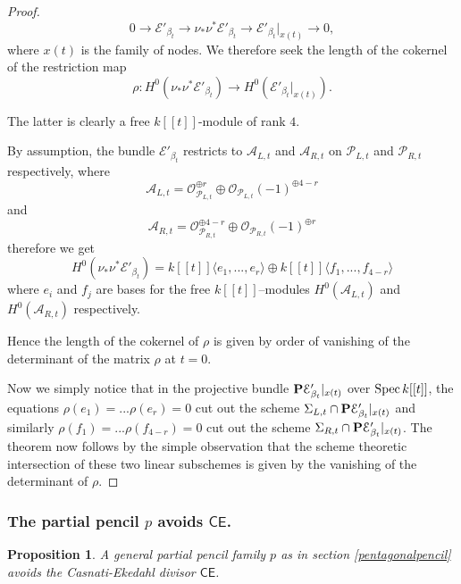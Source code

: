 \documentclass[reqno, 10 pt]{article}
\newtheorem{prop}[thm]{Proposition}
\theoremstyle{definition}
\theoremstyle{remark}
\numberwithin{equation}{section}
\numberwithin{thm}{section}
\numberwithin{prop}{section}
\numberwithin{lem}{section}
\numberwithin{cor}{section}
\numberwithin{conj}{section}
\numberwithin{defn}{section}
\renewcommand{\to}{\longrightarrow}
\newcommand{\sfCE}{{\mathsf {CE}}}
\newcommand{\cA}{{\mathcal A}}
\newcommand{\cE}{{\mathcal E}}
\newcommand{\cO}{{\mathcal O}}
\newcommand{\cP}{{\mathcal P}}
\renewcommand{\P}{{\bf P}}
\newcommand {\from}{{\colon}}
\newcommand{\Spec}{{\text{\rm Spec}\,}}
\begin{document}
\begin{proof}
\begin{equation}\label{exactseq2component}
0 \to \cE'_{\beta_{t}} \to \nu_{*}\nu^{*}\cE'_{\beta_{t}} \to \cE'_{\beta_{t}}|_{x(t)} \to 0,
\end{equation} 
where $x(t)$ is the family of nodes. We therefore seek the length of the cokernel of the restriction map $$\rho \from H^{0}(\nu_{*}\nu^{*}\cE'_{\beta_{t}}) \to H^{0}(\cE'_{\beta_{t}}|_{x(t)}).$$

The latter is clearly a free $k[[t]]$-module of rank $4$.



 By assumption, the bundle $\cE'_{\beta_{t}}$ restricts to $\cA_{L,t}$ and $\cA_{R,t}$ on $\cP_{L,t}$ and $\cP_{R,t}$ respectively, where $$\cA_{L,t} = \cO_{\cP_{L,t}}^{\oplus r} \oplus \cO_{\cP_{L,t}}(-1)^{\oplus 4-r}$$ and $$\cA_{R,t} = \cO_{\cP_{R,t}}^{\oplus 4-r} \oplus \cO_{\cP_{R,t}}(-1)^{\oplus r}$$ therefore we get \[H^{0}(\nu_{*}\nu^{*}\cE'_{\beta_{t}}) = k[[t]]\langle e_{1}, ... , e_{r} \rangle \oplus k[[t]]\langle f_{1}, ... , f_{4-r} \rangle \] where $e_{i}$ and $f_{j}$ are bases for the free $k[[t]]$--modules $H^{0}(\cA_{L,t})$ and $H^{0}(\cA_{R,t})$ respectively. 

Hence the length of the cokernel of $\rho$ is given by order of vanishing of the determinant of the matrix $\rho$ at $t=0$. 

Now we simply notice that in the projective bundle $\P \cE'_{\beta_{t}}|_{x(t)}$ over $\Spec k[[t]]$, the equations $\rho(e_{1}) = ... \rho(e_{r}) = 0$ cut out the scheme $\Sigma_{L,t} \cap \P \cE'_{\beta_{t}}|_{x(t)}$ and similarly $\rho(f_{1}) = ... \rho(f_{4-r}) = 0$ cut out the scheme $\Sigma_{R,t} \cap \P \cE'_{\beta_{t}}|_{x(t)}$.  The theorem now follows by the simple observation that the scheme theoretic intersection of these two linear subschemes is given by the vanishing of the determinant of $\rho$. 

\end{proof}

\subsubsection{The partial pencil $p$ avoids $\sfCE$.} 
\begin{prop}\label{avoidCE}
A general partial pencil family $p$ as in section \ref{pentagonalpencil} avoids the Casnati-Ekedahl divisor $\sfCE$.
\end{prop}
\end{document}
